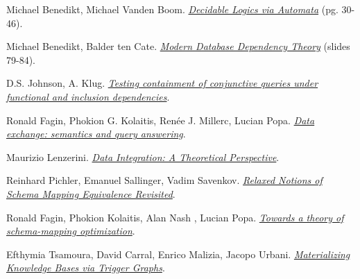 \documentclass[11pt, a4paper, dvipsnames]{article}
\begin{document}
\begin{thebibliography}{9}

Michael Benedikt, Michael Vanden Boom. \emph{\href{http://www.cs.ox.ac.uk/michael.benedikt/readingcourse/coursenotes2020.pdf}{Decidable Logics via Automata}} (pg. 30-46).

Michael Benedikt, Balder ten Cate. \emph{\href{https://cpb-us-e1.wpmucdn.com/sites.ucsc.edu/dist/4/1230/files/2014/09/esslli-all.compressed.pdf} {Modern Database
Dependency Theory}} (slides 79-84).

D.S. Johnson, A. Klug. \emph{\href{https://cs.uwaterloo.ca/~david/kbdb/johnstonandklug.pdf}{Testing containment of conjunctive queries under functional and inclusion dependencies}}.

Ronald Fagin, Phokion G. Kolaitis, Renée J. Millerc,
Lucian Popa. \emph{\href{http://dblab.cs.toronto.edu/project/dataexchange/docs/tcs05.pdf}{Data exchange: semantics and query answering}}.

Maurizio Lenzerini. \emph{\href{https://tanca.faculty.polimi.it/wp-content/uploads/images/documents/TIS/lezioni/1_3_integration-lenzerini.pdf}{Data Integration: A Theoretical Perspective}}.

Reinhard Pichler, Emanuel Sallinger, Vadim Savenkov. \emph{\href{http://www.dit.unitn.it/~p2p/RelatedWork/Matching/a10-pichler.pdf}{Relaxed Notions of Schema Mapping Equivalence Revisited}}.

Ronald Fagin, Phokion Kolaitis, Alan Nash
, Lucian Popa. \emph{\href{https://www.researchgate.net/publication/221559365_Towards_a_theory_of_schema-mapping_optimization}{Towards a theory of schema-mapping optimization}}.

Efthymia Tsamoura, David Carral, Enrico Malizia, Jacopo Urbani. \emph{\href{http://www.vldb.org/pvldb/vol14/p943-tsamoura.pdf}{Materializing Knowledge Bases via Trigger Graphs}}.

\end{thebibliography}
\end{document}
